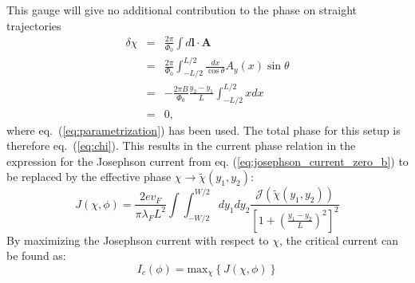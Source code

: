 This gauge will give no additional contribution to the phase on straight trajectories
\begin{eqnarray}
\delta \chi &=& \frac{2 \pi}{\Phi_0} \int d \mathbf{l} \cdot \mathbf{A} \\
&=& \frac{2 \pi}{\Phi_0} \int_{-L/2}^{L/2} \frac{dx}{\cos \theta} A_y (x) \sin \theta \\
&=& - \frac{2 \pi B}{\Phi_0} \frac{y_2 - y_1}{L} \int_{-L/2}^{L/2} x dx \\
&=& 0, 
\end{eqnarray}
where eq.~(\ref{eq:parametrization}) has been used. The total phase for this setup is therefore eq.~(\ref{eq:chi}). This results in the current phase relation in the expression for the Josephson current from eq. (\ref{eq:josephson_current_zero_b}) to be replaced by the effective phase $\chi \rightarrow \tilde{\chi}(y_1, y_2)$:
\begin{equation}
J\left(\chi, \phi \right) = \frac{2 e v_F}{\pi \lambda_F L^2}  \int \int_{-W/2}^{W/2} d y_1 d y_2 \frac{\mathcal{J}(\tilde{\chi}(y_1, y_2))}{\left[ 1 + \left(\frac{y_1 - y_2}{L}\right)^2\right]^2}
\label{eq:josephson_current}
\end{equation}
By maximizing the Josephson current with respect to $\chi$, the critical current can be found as:
\begin{equation}
I_c(\phi) = \text{max}_{\chi}\left\{ J(\chi, \phi) \right\}
\end{equation}

